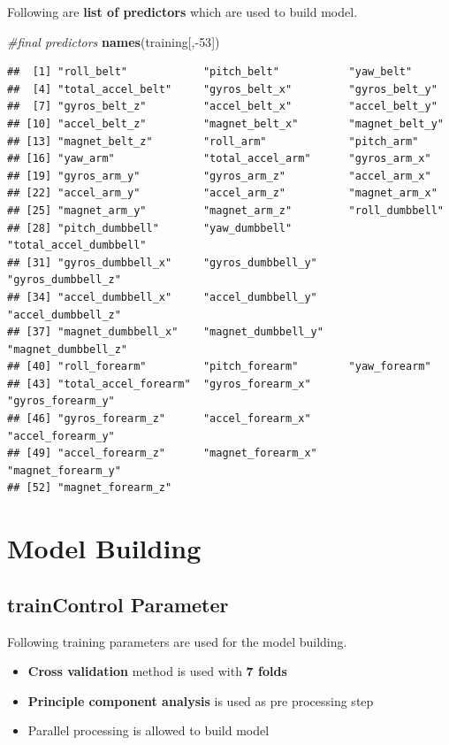 \documentclass[]{article}
\newenvironment{Shaded}{\begin{snugshade}}{\end{snugshade}}
\newcommand{\KeywordTok}[1]{\textcolor[rgb]{0.13,0.29,0.53}{\textbf{{#1}}}}
\newcommand{\DecValTok}[1]{\textcolor[rgb]{0.00,0.00,0.81}{{#1}}}
\newcommand{\CommentTok}[1]{\textcolor[rgb]{0.56,0.35,0.01}{\textit{{#1}}}}
\newcommand{\NormalTok}[1]{{#1}}
\providecommand{\tightlist}{%
  \setlength{\itemsep}{0pt}\setlength{\parskip}{0pt}}
\begin{document}
Following are \textbf{list of predictors} which are used to build model.

\begin{Shaded}
\begin{Highlighting}[]
\CommentTok{#final predictors}
\KeywordTok{names}\NormalTok{(training[,-}\DecValTok{53}\NormalTok{])}
\end{Highlighting}
\end{Shaded}

\begin{verbatim}
##  [1] "roll_belt"            "pitch_belt"           "yaw_belt"            
##  [4] "total_accel_belt"     "gyros_belt_x"         "gyros_belt_y"        
##  [7] "gyros_belt_z"         "accel_belt_x"         "accel_belt_y"        
## [10] "accel_belt_z"         "magnet_belt_x"        "magnet_belt_y"       
## [13] "magnet_belt_z"        "roll_arm"             "pitch_arm"           
## [16] "yaw_arm"              "total_accel_arm"      "gyros_arm_x"         
## [19] "gyros_arm_y"          "gyros_arm_z"          "accel_arm_x"         
## [22] "accel_arm_y"          "accel_arm_z"          "magnet_arm_x"        
## [25] "magnet_arm_y"         "magnet_arm_z"         "roll_dumbbell"       
## [28] "pitch_dumbbell"       "yaw_dumbbell"         "total_accel_dumbbell"
## [31] "gyros_dumbbell_x"     "gyros_dumbbell_y"     "gyros_dumbbell_z"    
## [34] "accel_dumbbell_x"     "accel_dumbbell_y"     "accel_dumbbell_z"    
## [37] "magnet_dumbbell_x"    "magnet_dumbbell_y"    "magnet_dumbbell_z"   
## [40] "roll_forearm"         "pitch_forearm"        "yaw_forearm"         
## [43] "total_accel_forearm"  "gyros_forearm_x"      "gyros_forearm_y"     
## [46] "gyros_forearm_z"      "accel_forearm_x"      "accel_forearm_y"     
## [49] "accel_forearm_z"      "magnet_forearm_x"     "magnet_forearm_y"    
## [52] "magnet_forearm_z"
\end{verbatim}

\section{Model Building}\label{model-building}

\subsection{trainControl Parameter}\label{traincontrol-parameter}

Following training parameters are used for the model building.

\begin{itemize}
\tightlist
\item
  \textbf{Cross validation} method is used with \textbf{7 folds}
\item
  \textbf{Principle component analysis} is used as pre processing step
\item
  Parallel processing is allowed to build model
\end{itemize}
\end{document}
